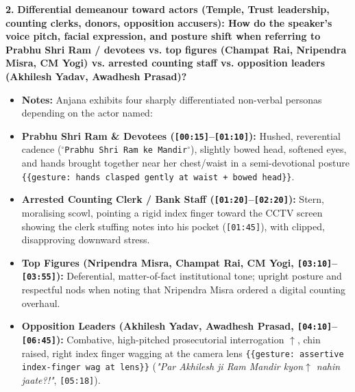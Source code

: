 \documentclass[10pt,a4paper]{article}
\begin{document}
\noindent\textbf{2.} \textbf{Differential demeanour toward actors (Temple, Trust leadership, counting clerks, donors, opposition accusers): How do the speaker's voice pitch, facial expression, and posture shift when referring to Prabhu Shri Ram / devotees vs. top figures (Champat Rai, Nripendra Misra, CM Yogi) vs. arrested counting staff vs. opposition leaders (Akhilesh Yadav, Awadhesh Prasad)?}\par\smallskip
\begin{itemize}
  \item \textbf{Notes:}
Anjana exhibits four sharply differentiated non-verbal personas depending on the actor named:\par\smallskip
  \item \textbf{Prabhu Shri Ram \& Devotees (\texttt{[00:15]}--\texttt{[01:10]}):} Hushed, reverential cadence (\texttt{$^\circ$Prabhu Shri Ram ke Mandir$^\circ$}), slightly bowed head, softened eyes, and hands brought together near her chest/waist in a semi-devotional posture \texttt{\{\{gesture: hands clasped gently at waist + bowed head\}\}}.
  \item \textbf{Arrested Counting Clerk / Bank Staff (\texttt{[01:20]}--\texttt{[02:20]}):} Stern, moralising scowl, pointing a rigid index finger toward the CCTV screen showing the clerk stuffing notes into his pocket (\texttt{[01:45]}), with clipped, disapproving downward stress.
  \item \textbf{Top Figures (Nripendra Misra, Champat Rai, CM Yogi, \texttt{[03:10]}--\texttt{[03:55]}):} Deferential, matter-of-fact institutional tone; upright posture and respectful nods when noting that Nripendra Misra ordered a digital counting overhaul.
  \item \textbf{Opposition Leaders (Akhilesh Yadav, Awadhesh Prasad, \texttt{[04:10]}--\texttt{[06:45]}):} Combative, high-pitched prosecutorial interrogation \texttt{$\uparrow$}, chin raised, right index finger wagging at the camera lens \texttt{\{\{gesture: assertive index-finger wag at lens\}\}} (\textit{"Par Akhilesh ji Ram Mandir kyon$\uparrow$ nahin jaate?!"}, \texttt{[05:18]}).
\end{itemize}
\end{document}

